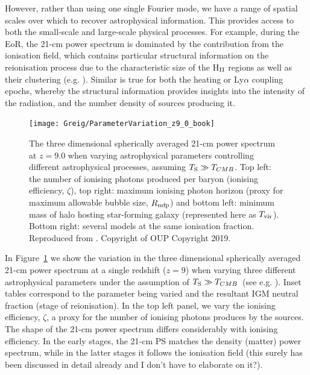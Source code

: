However, rather than using one single Fourier mode, we have a range of spatial scales over which to recover astrophysical information. This provides access to both the small-scale and large-scale physical processes. For example, during the EoR, the 21-cm power spectrum is dominated by the contribution from the ionisation field, which contains particular structural information on the reionisation process due to the characteristic size of the H$_{\rm \scriptsize II}$ regions as well as their clustering (e.g. \cite{Lidz:2008}). Similar is true for both the heating or Ly$\alpha$ coupling epochs, whereby the structural information provides insights into the intensity of the radiation, and the number density of sources producing it.

\begin{figure}[]
\begin{center}
\texttt{[image: Greig/ParameterVariation\_z9\_0\_book]}
\end{center}
\caption{The three dimensional spherically averaged 21-cm power spectrum at $z=9.0$ when varying astrophysical parameters controlling different astrophysical processes, assuming $T_{\rm S} \gg T_{CMB}$. Top left: the number of ionising photons produced per baryon (ionising efficiency, $\zeta$), top right: maximum ionising photon horizon (proxy for maximum allowable bubble size, $R_{\rm mfp}$) and bottom left: minimum mass of halo hosting star-forming galaxy (represented here as $T_{\rm vir}$). Bottom right: several models at the same ionisation fraction. Reproduced from \cite{Greig:2015}. Copyright of OUP Copyright 2019.}
\label{fig:PSvariation}
\end{figure}

In Figure~\ref{fig:PSvariation} we show the variation in the three dimensional spherically averaged 21-cm power spectrum at a single redshift ($z=9$) when varying three different astrophysical parameters under the assumption of $T_{\rm S} \gg T_{CMB}$~(see e.g. \cite{Greig:2015}). Inset tables correspond to the parameter being varied and the resultant IGM neutral fraction (stage of reionisation). In the top left panel, we vary the ionising efficiency, $\zeta$, a proxy for the number of ionising photons produces by the sources. The shape of the 21-cm power spectrum differs considerably with ionising efficiency. In the early stages, the 21-cm PS matches the density (matter) power spectrum, while in the latter stages it follows the ionisation field {\color{red} (this surely has been discussed in detail already and I don't have to elaborate on it?)}. 

